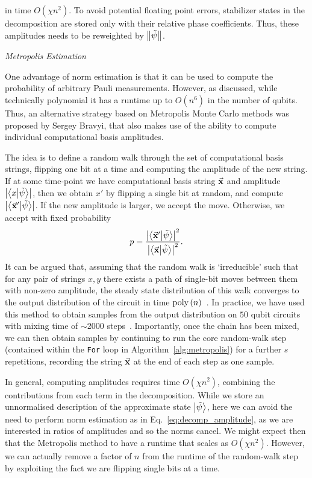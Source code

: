 in time $O(\chi n^{2})$. To avoid potential floating point errors, stabilizer states in the decomposition are stored only with their relative phase coefficients. Thus, these amplitudes needs to be reweighted by $\norm{\tilde{\psi}}$.\par
\large{\itshape{Metropolis Estimation}}\par
One advantage of norm estimation is that it can be used to compute the probability of arbitrary Pauli measurements. However, as discussed, while technically polynomial it has a runtime up to $O(n^{6})$ in the number of qubits. Thus, an alternative strategy based on Metropolis Monte Carlo methods was proposed by Sergey Bravyi, that also makes use of the ability to compute individual computational basis amplitudes.\par
The idea is to define a random walk through the set of computational basis strings, flipping one bit at a time and computing the amplitude of the new string. If at some time-point we have computational basis string $\va{x}$ and amplitude $\left|\braket{x}{\tilde{\psi}}\right|$, then we obtain $x'$ by flipping a single bit at random, and compute $\left|\braket{\va{x}'}{\tilde{\psi}}\right|$. If the new amplitude is larger, we accept the move. Otherwise, we accept with fixed probability
\[p = \frac{\left|\braket{\va{x}'}{\tilde{\psi}}\right|^{2}}{\left|\braket{\va{x}}{\tilde{\psi}}\right|^{2}}.\]
It can be argued that, assuming that the random walk is `irreducible' such that for any pair of strings $x, y$ there exists a path of single-bit moves between them with non-zero amplitude, the steady state distribution of this walk converges to the output distribution of the circuit in time $\text{poly}\left({n}\right)$~\cite{Bravyi2018}. In practice, we have used this method to obtain samples from the output distribution on $50$ qubit circuits with mixing time of $\sim 2000$ steps~\cite{Bravyi2018}. Importantly, once the chain has been mixed, we can then obtain samples by continuing to run the core random-walk step (contained within the \texttt{For} loop in Algorithm~\ref{alg:metropolis}) for a further $s$ repetitions, recording the string $\va{x}$ at the end of each step as one sample.\par
In general, computing amplitudes requires time $O\left(\chi n^{2}\right)$, combining the contributions from each term in the decomposition. While we store an unnormalised description of the approximate state $\ket{\tilde{\psi}}$, here we can avoid the need to perform norm estimation as in Eq.~\ref{eq:decomp_amplitude}, as we are interested in ratios of amplitudes and so the norms cancel. We might expect then that the Metropolis method to have a runtime that scales as $O\left(\chi n^{2}\right)$. However, we can actually remove a factor of $n$ from the runtime of the random-walk step by exploiting the fact we are flipping single bits at a time.\par
